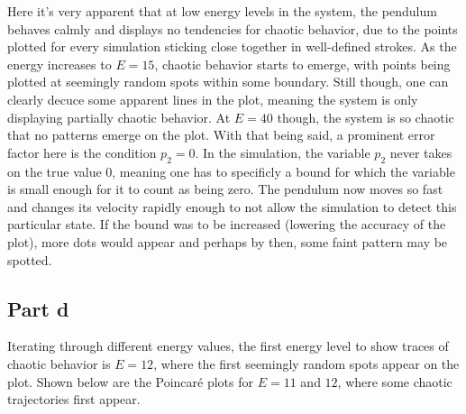 \documentclass[a4paper,12pt]{article}
\begin{document}
Here it's very apparent that at low energy levels in the system, the pendulum behaves calmly and displays no tendencies
for chaotic behavior, due to the points plotted for every simulation sticking close together in well-defined strokes.
As the energy increases to $E = 15$, chaotic behavior starts to emerge, with points being plotted at seemingly random spots
within some boundary. Still though, one can clearly decuce some apparent lines in the plot, meaning the system is only
displaying partially chaotic behavior. At $E = 40$ though, the system is so chaotic that no patterns emerge on the plot.
With that being said, a prominent error factor here is the condition $p_2 = 0$. In the simulation, the variable $p_2$ never
takes on the true value $0$, meaning one has to specificly a bound for which the variable is small enough for it to count
as being zero. The pendulum now moves so fast and changes its velocity rapidly enough to not allow the simulation to detect
this particular state. If the bound was to be increased (lowering the accuracy of the plot), more dots would appear and
perhaps by then, some faint pattern may be spotted.

\subsection*{Part d}

Iterating through different energy values, the first energy level to show traces of chaotic behavior is $E = 12$, where the
first seemingly random spots appear on the plot. Shown below are the Poincaré plots for $E = 11$ and $12$, where some chaotic
trajectories first appear.
\end{document}

